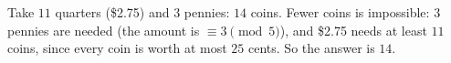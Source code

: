 Take $11$ quarters (\$2.75) and $3$ pennies: $14$ coins. Fewer coins is impossible: $3$ pennies are needed (the amount is $\equiv3\pmod5$), and \$2.75 needs at least $11$ coins, since every coin is worth at most $25$ cents. So the answer is $\boxed{14}$.

